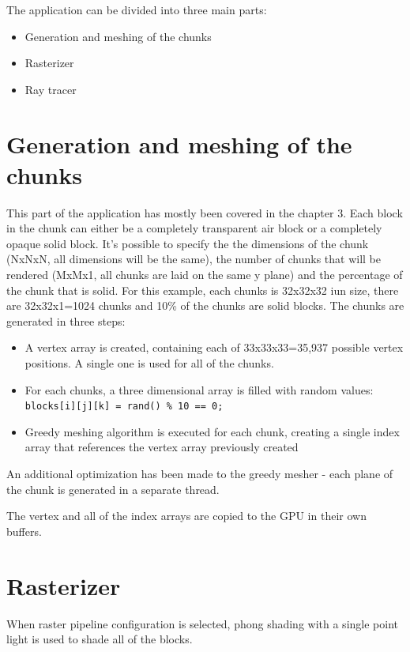 \documentclass[times, utf8, zavrsni, numeric]{fer}
\begin{document}
The application can be divided into three main parts:
\begin{itemize}
	\item{Generation and meshing of the chunks}
	\item{Rasterizer}
	\item{Ray tracer}
\end{itemize}

\section{Generation and meshing of the chunks}
This part of the application has mostly been covered in the chapter 3. Each block in the chunk can either be a completely transparent air block or a completely opaque solid block. It's possible to specify the the dimensions of the chunk (NxNxN, all dimensions will be the same), the number of chunks that will be rendered (MxMx1, all chunks are laid on the same y plane) and the percentage of the chunk that is solid. For this example, each chunks is 32x32x32 iun size, there are 32x32x1=1024 chunks and 10\% of the chunks are solid blocks. The chunks are generated in three steps:
\begin{itemize}
	\item{A vertex array is created, containing each of 33x33x33=35,937 possible vertex positions. A single one is used for all of the chunks.}
	\item{For each chunks, a three dimensional array is filled with random values: \texttt{blocks[i][j][k] = rand() \% 10 == 0;}}
	\item{Greedy meshing algorithm is executed for each chunk, creating a single index array that references the vertex array previously created}
\end{itemize}

An additional optimization has been made to the greedy mesher - each plane of the chunk is generated in a separate thread.

The vertex and all of the index arrays are copied to the GPU in their own buffers.

\section{Rasterizer}
When raster pipeline configuration is selected, phong shading with a single point light is used to shade all of the blocks.
\end{document}
